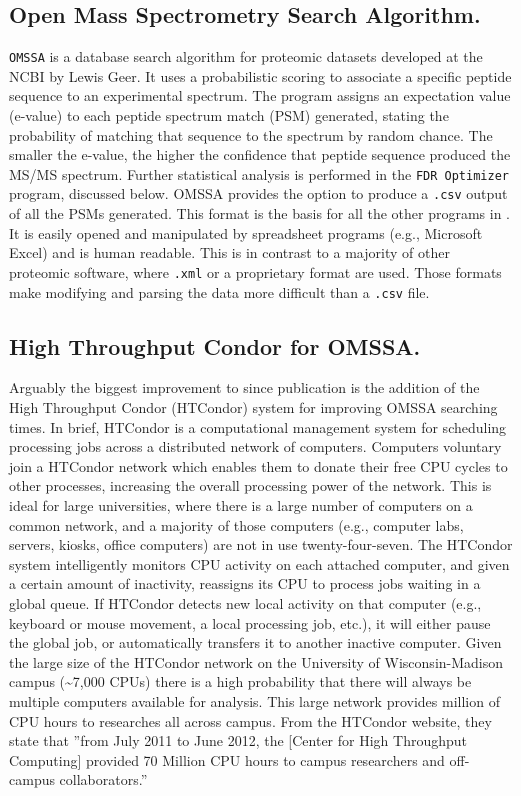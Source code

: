 \subsection*{Open Mass Spectrometry Search Algorithm.}
\texttt{OMSSA} is a database search algorithm for proteomic datasets developed at the NCBI by Lewis Geer.\cite{omssa} It uses a probabilistic scoring to associate a specific peptide sequence to an experimental spectrum. The program assigns an expectation value (e-value) to each peptide spectrum match (PSM) generated, stating the probability of matching that sequence to the spectrum by random chance. The smaller the e-value, the higher the confidence that peptide sequence produced the MS/MS spectrum. Further statistical analysis is performed in the \texttt{FDR Optimizer} program, discussed below. OMSSA provides the option to produce a \texttt{.csv} output of all the PSMs generated. This format is the basis for all the other programs in \compass{}. It is easily opened and manipulated by spreadsheet programs (e.g., Microsoft Excel) and is human readable. This is in contrast to a majority of other proteomic software, where \texttt{.xml} or a proprietary format are used. Those formats make modifying and parsing the data more difficult than a \texttt{.csv} file.

\subsection*{High Throughput Condor for OMSSA.}
Arguably the biggest improvement to \compass{} since publication is the addition of the High Throughput Condor (HTCondor) system for improving OMSSA searching times. In brief, HTCondor is a computational management system for scheduling processing jobs across a distributed network of computers. Computers voluntary join a HTCondor network which enables them to donate their free CPU cycles to other processes, increasing the overall processing power of the network. This is ideal for large universities, where there is a large number of computers on a common network, and a majority of those computers (e.g., computer labs, servers, kiosks, office computers) are not in use twenty-four-seven. The HTCondor system intelligently monitors CPU activity on each attached computer, and given a certain amount of inactivity, reassigns its CPU to process jobs waiting in a global queue. If HTCondor detects new local activity on that computer (e.g., keyboard or mouse movement, a local processing job, etc.), it will either pause the global job, or automatically transfers it to another inactive computer. Given the large size of the HTCondor network on the University of Wisconsin-Madison campus (\textasciitilde7,000 CPUs) there is a high probability that there will always be multiple computers available for analysis. This large network provides million of CPU hours to researches all across campus. From the HTCondor website, they state that ''from July 2011 to June 2012, the [Center for High Throughput Computing] provided 70 Million CPU hours to campus researchers and off-campus collaborators.''

